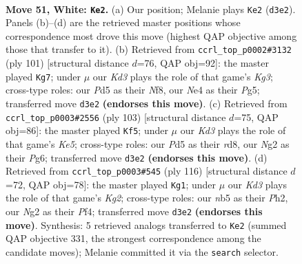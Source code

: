 \documentclass[11pt]{article}
\begin{document}
\clearpage

\begin{figure}[p]\centering
\begin{subfigure}{0.46\textwidth}\centering
\resizebox{\linewidth}{!}{%
\newchessgame
\chessboard[
  setfen={6k1/1r3pb1/R7/1n1P2R1/3qN3/3K4/6N1/8 w - - 1 51},
  showmover=false,
  pgfstyle=straightmove, color=movearrow, markmove={d3-e2}
]}
\caption{}
\end{subfigure}\hfill
\begin{subfigure}{0.46\textwidth}\centering
\resizebox{\linewidth}{!}{%
\newchessgame
\chessboard[
  setfen={5n2/8/4r1k1/5Qp1/1P6/5PN1/1q3NK1/8 b - - 4 51},
  showmover=false,
  pgfstyle=straightmove, color=movearrow, markmove={g6-g7}
]}
\caption{}
\end{subfigure}
\\[4pt]
\begin{subfigure}{0.46\textwidth}\centering
\resizebox{\linewidth}{!}{%
\newchessgame
\chessboard[
  setfen={3R4/8/6p1/3Bn3/1P2k3/6PP/4p3/4rNK1 b - - 1 52},
  showmover=false,
  pgfstyle=straightmove, color=movearrow, markmove={e4-f5}
]}
\caption{}
\end{subfigure}\hfill
\begin{subfigure}{0.46\textwidth}\centering
\resizebox{\linewidth}{!}{%
\newchessgame
\chessboard[
  setfen={7k/6bp/7r/2Q5/5P2/5RNq/6KP/8 w - - 11 59},
  showmover=false,
  pgfstyle=straightmove, color=movearrow, markmove={g2-g1}
]}
\caption{}
\end{subfigure}
\caption{\textbf{Move 51, White: \texttt{Ke2}.} (a) Our position; Melanie plays \texttt{Ke2} (\texttt{d3e2}). Panels (b)--(d) are the retrieved master positions whose correspondence most drove this move (highest QAP objective among those that transfer to it). (b) Retrieved from \texttt{ccrl\_top\_p0002\#3132} (ply 101) [structural distance $d$=76, QAP obj=92]: the master played \texttt{Kg7}; under $\mu$ our \emph{Kd3} plays the role of that game's \emph{Kg3}; cross-type roles: our \emph{P}d5 as their \emph{N}f8, our \emph{N}e4 as their \emph{P}g5; transferred move \texttt{d3e2} \textbf{(endorses this move)}. (c) Retrieved from \texttt{ccrl\_top\_p0003\#2556} (ply 103) [structural distance $d$=75, QAP obj=86]: the master played \texttt{Kf5}; under $\mu$ our \emph{Kd3} plays the role of that game's \emph{Ke5}; cross-type roles: our \emph{P}d5 as their \emph{r}d8, our \emph{N}g2 as their \emph{P}g6; transferred move \texttt{d3e2} \textbf{(endorses this move)}. (d) Retrieved from \texttt{ccrl\_top\_p0003\#545} (ply 116) [structural distance $d$=72, QAP obj=78]: the master played \texttt{Kg1}; under $\mu$ our \emph{Kd3} plays the role of that game's \emph{Kg2}; cross-type roles: our \emph{n}b5 as their \emph{P}h2, our \emph{N}g2 as their \emph{P}f4; transferred move \texttt{d3e2} \textbf{(endorses this move)}. Synthesis: 5 retrieved analogs transferred to \texttt{Ke2} (summed QAP objective 331, the strongest correspondence among the candidate moves); Melanie committed it via the \texttt{search} selector.}
\label{fig:thought-m100}
\end{figure}
\end{document}
